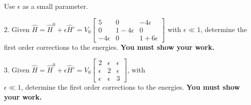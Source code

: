 \documentclass[aps,pra,showpacs,showkeys,twocolumn,groupedaddress]{revtex4-1}
\begin{document}
Use $\epsilon$ as a small parameter.


2. Given $\hat{H} = \hat{H}^0 + \epsilon\hat{H}' = V_0
\left[
\begin{array}{rrr}
5&0&-4\epsilon\\
0&1-4\epsilon&0\\
-4\epsilon&0&1+6\epsilon
\end{array}
\right]$ with $\epsilon \ll 1$, determine the first order corrections to the energies.  {\bf You must show your work.}


3. Given $\hat{H} = \hat{H}^0 + \epsilon\hat{H}' = V_0
\left[
\begin{array}{rrr}
2&\epsilon&\epsilon\\
\epsilon&2&\epsilon\\
\epsilon&\epsilon&3
\end{array}
\right]$, with\\ $\epsilon \ll 1$, determine the first order corrections to the energies.  {\bf You must show your work.}
\end{document}

